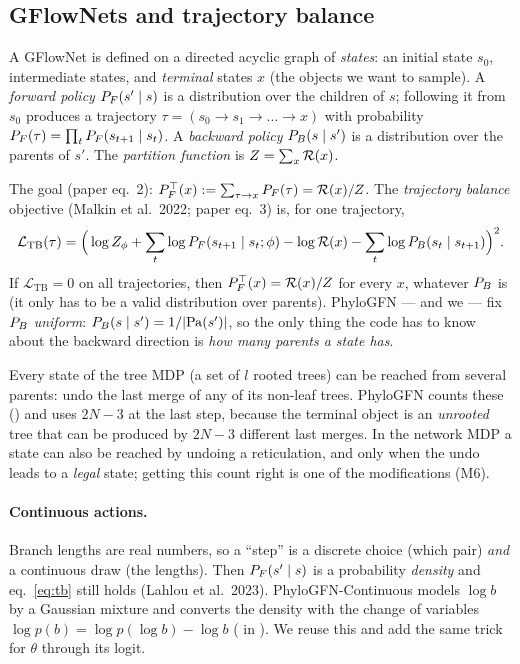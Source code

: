 \subsection{GFlowNets and trajectory balance}
\begin{defbox}
A GFlowNet is defined on a directed acyclic graph of \emph{states}: an initial state $s_0$, intermediate states, and \emph{terminal} states $x$ (the objects we want to sample). A \emph{forward policy} $P_F(s'\mid s)$ is a distribution over the children of $s$; following it from $s_0$ produces a trajectory $\tau=(s_0\to s_1\to\dots\to x)$ with probability $P_F(\tau)=\prod_tP_F(s_{t+1}\mid s_t)$. A \emph{backward policy} $P_B(s\mid s')$ is a distribution over the parents of $s'$. The \emph{partition function} is $Z=\sum_x\mathcal{R}(x)$.
\end{defbox}
The goal (paper eq.~2): $P_F^{\top}(x):=\sum_{\tau\to x}P_F(\tau)=\mathcal{R}(x)/Z$. The \emph{trajectory balance} objective (Malkin et al.\ 2022; paper eq.~3) is, for one trajectory,
\begin{equation}\label{eq:tb}
\mathcal L_{\mathrm{TB}}(\tau)=\Big(\log Z_\phi+\sum_t\log P_F(s_{t+1}\mid s_t;\phi)-\log\mathcal{R}(x)-\sum_t\log P_B(s_t\mid s_{t+1})\Big)^2 .
\end{equation}
If $\mathcal L_{\mathrm{TB}}=0$ on all trajectories, then $P_F^\top(x)=\mathcal{R}(x)/Z$ for every $x$, whatever $P_B$ is (it only has to be a valid distribution over parents). PhyloGFN --- and we --- fix $P_B$ \emph{uniform}: $P_B(s\mid s')=1/|\mathrm{Pa}(s')|$, so the only thing the code has to know about the backward direction is \emph{how many parents a state has}.

\begin{whybox}
Every state of the tree MDP (a set of $l$ rooted trees) can be reached from several parents: undo the last merge of any of its non-leaf trees. PhyloGFN counts these () and uses $2N-3$ at the last step, because the terminal object is an \emph{unrooted} tree that can be produced by $2N-3$ different last merges. In the network MDP a state can also be reached by undoing a reticulation, and only when the undo leads to a \emph{legal} state; getting this count right is one of the modifications (M6).
\end{whybox}

\paragraph{Continuous actions.} Branch lengths are real numbers, so a ``step'' is a discrete choice (which pair) \emph{and} a continuous draw (the lengths). Then $P_F(s'\mid s)$ is a probability \emph{density} and eq.~\eqref{eq:tb} still holds (Lahlou et al.\ 2023). PhyloGFN-Continuous models $\log b$ by a Gaussian mixture and converts the density with the change of variables $\log p(b)=\log p(\log b)-\log b$ ( in ). We reuse this and add the same trick for $\theta$ through its logit.

